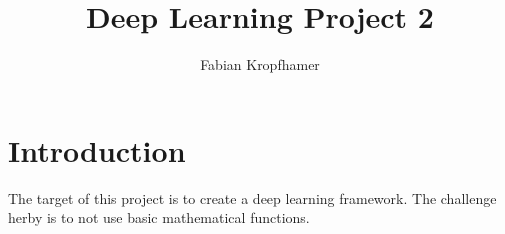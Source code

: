 \documentclass[12pt]{article}
\title{
	Deep Learning Project 2
}
\author{Fabian Kropfhamer}
\begin{document}
\maketitle


\section{Introduction}
The target of this project is to create a deep learning framework.
The challenge herby is to not use basic mathematical functions.
\end{document}
